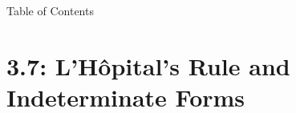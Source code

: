 
\begin{frame}{Table of Contents}
\mapofcontentsC{\cg}
\end{frame}
\section*{3.7: L'H\^{o}pital's Rule and Indeterminate Forms}


